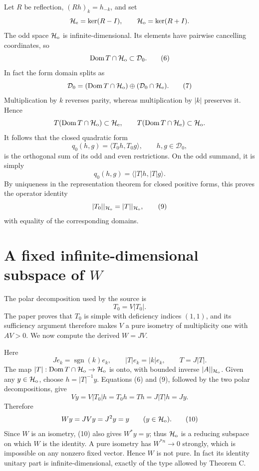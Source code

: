 \documentclass[11pt]{article}
\newcommand{\Hh}{\mathcal H}
\newcommand{\Dom}{\operatorname{Dom}}
\begin{document}
Let \(R\) be reflection, \((Rh)_k=h_{-k}\), and set
\[
 \Hh_{\rm e}=\ker(R-I),\qquad
 \Hh_{\rm o}=\ker(R+I).
\]
The odd space \(\Hh_{\rm o}\) is infinite-dimensional.  Its elements have
pairwise cancelling coordinates, so
\begin{equation}
 \Dom T\cap\Hh_{\rm o}\subset\mathcal D_0.
 \tag{6}
\end{equation}
In fact the form domain splits as
\begin{equation}
 \mathcal D_0=(\Dom T\cap\Hh_{\rm o})
 \oplus(\mathcal D_0\cap\Hh_{\rm e}).
 \tag{7}
\end{equation}
Multiplication by \(k\) reverses parity, whereas multiplication by \(|k|\)
preserves it.  Hence
\[
 T(\Dom T\cap\Hh_{\rm o})\subset\Hh_{\rm e},
 \qquad
 T(\Dom T\cap\Hh_{\rm e})\subset\Hh_{\rm o}.
\]
It follows that the closed quadratic form
\begin{equation}
 q_0(h,g)=\langle T_0h,T_0g\rangle,
 \qquad h,g\in\mathcal D_0,
 \tag{8}
\end{equation}
is the orthogonal sum of its odd and even restrictions.  On the odd summand,
it is simply
\[
 q_0(h,g)=\langle |T|h,|T|g\rangle.
\]
By uniqueness in the representation theorem for closed positive forms, this
proves the operator identity
\begin{equation}
 |T_0||_{\Hh_{\rm o}}=|T||_{\Hh_{\rm o}},
 \tag{9}
\end{equation}
with equality of the corresponding domains.

\section{A fixed infinite-dimensional subspace of
\texorpdfstring{\(W\)}{W}}

The polar decomposition used by the source is
\[
 T_0=V|T_0|.
\]
The paper proves that \(T_0\) is simple with deficiency indices \((1,1)\),
and its sufficiency argument therefore makes \(V\) a pure isometry of
multiplicity one with \(AV>0\).  We now compute the derived \(W=JV\).

Here
\[
 Je_k=\operatorname{sgn}(k)e_k,
 \qquad |T|e_k=|k|e_k,
 \qquad T=J|T|.
\]
The map \(|T|:\Dom T\cap\Hh_{\rm o}\to\Hh_{\rm o}\) is onto, with bounded
inverse \(|A||_{\Hh_{\rm o}}\).  Given any \(y\in\Hh_{\rm o}\), choose
\(h=|T|^{-1}y\).  Equations (6) and (9), followed by the two polar
decompositions, give
\[
 Vy=V|T_0|h=T_0h=Th=J|T|h=Jy.
\]
Therefore
\begin{equation}
 Wy=JVy=J^2y=y
 \qquad(y\in\Hh_{\rm o}).
 \tag{10}
\end{equation}
Since \(W\) is an isometry, (10) also gives \(W^*y=y\); thus
\(\Hh_{\rm o}\) is a reducing subspace on which \(W\) is the identity.
A pure isometry has \(W^{*n}\to0\) strongly, which is impossible on any
nonzero fixed vector.  Hence \(W\) is not pure.  In fact its identity unitary
part is infinite-dimensional, exactly of the type allowed by Theorem C.
\end{document}
